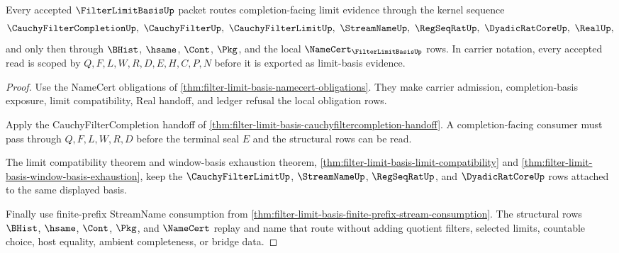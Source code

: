 \begin{theorem}
\label{thm:filter-limit-basis-kernel-scope-upgrade}
Every accepted $\FilterLimitBasisUp$ packet routes completion-facing limit evidence through the kernel sequence
$$
\CauchyFilterCompletionUp,\ \CauchyFilterUp,\ \CauchyFilterLimitUp,\ \StreamNameUp,\ \RegSeqRatUp,\ \DyadicRatCoreUp,\ \RealUp,
$$
and only then through $\BHist$, $\hsame$, $\Cont$, $\Pkg$, and the local $\NameCert_{\FilterLimitBasisUp}$ rows. In carrier notation, every accepted read is scoped by $Q,F,L,W,R,D,E,H,C,P,N$ before it is exported as limit-basis evidence.
\end{theorem}
\begin{proof}
Use the NameCert obligations of \autoref{thm:filter-limit-basis-namecert-obligations}. They make carrier admission, completion-basis exposure, limit compatibility, Real handoff, and ledger refusal the local obligation rows.

Apply the CauchyFilterCompletion handoff of \autoref{thm:filter-limit-basis-cauchyfiltercompletion-handoff}. A completion-facing consumer must pass through $Q,F,L,W,R,D$ before the terminal seal $E$ and the structural rows can be read.

The limit compatibility theorem and window-basis exhaustion theorem, \autoref{thm:filter-limit-basis-limit-compatibility} and \autoref{thm:filter-limit-basis-window-basis-exhaustion}, keep the $\CauchyFilterLimitUp$, $\StreamNameUp$, $\RegSeqRatUp$, and $\DyadicRatCoreUp$ rows attached to the same displayed basis.

Finally use finite-prefix StreamName consumption from \autoref{thm:filter-limit-basis-finite-prefix-stream-consumption}. The structural rows $\BHist$, $\hsame$, $\Cont$, $\Pkg$, and $\NameCert$ replay and name that route without adding quotient filters, selected limits, countable choice, host equality, ambient completeness, or bridge data.
\end{proof}

